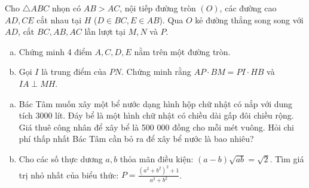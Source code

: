\begin{ex} %
	Cho $\triangle ABC$ nhọn có $AB > AC$, nội tiếp đường tròn $(O)$, các đường cao $AD, CE$ cắt nhau tại $H$ ($D \in BC, E \in AB$). Qua $O$ kẻ đường thẳng song song với $AD$, cắt $BC, AB, AC$ lần lượt tại $M, N$ và $P$.
	\begin{enumerate}[a)]
		\item Chứng minh 4 điểm $A, C, D, E$ nằm trên một đường tròn.
		\item Gọi $I$ là trung điểm của $PN$. Chứng minh rằng $AP \cdot BM = PI \cdot HB$ và $IA \perp MH$.
	\end{enumerate}
	\loigiai{}
\end{ex}

\begin{ex} %
	\begin{enumerate}[a)]
		\item Bác Tâm muốn xây một bể nước dạng hình hộp chữ nhật có nắp với dung tích 3000 lít. Đáy bể là một hình chữ nhật có chiều dài gấp đôi chiều rộng. Giá thuê công nhân để xây bể là 500 000 đồng cho mỗi mét vuông. Hỏi chi phí thấp nhất Bác Tâm cần bỏ ra để xây bể nước là bao nhiêu?
		\item Cho các số thực dương $a, b$ thỏa mãn điều kiện: $(a-b)\sqrt{ab} = \sqrt{2}$.
		Tìm giá trị nhỏ nhất của biểu thức: $P = \frac{(a^2+b^2)^2+1}{a^2+b^2}$.
	\end{enumerate}
	\loigiai{}
\end{ex}

